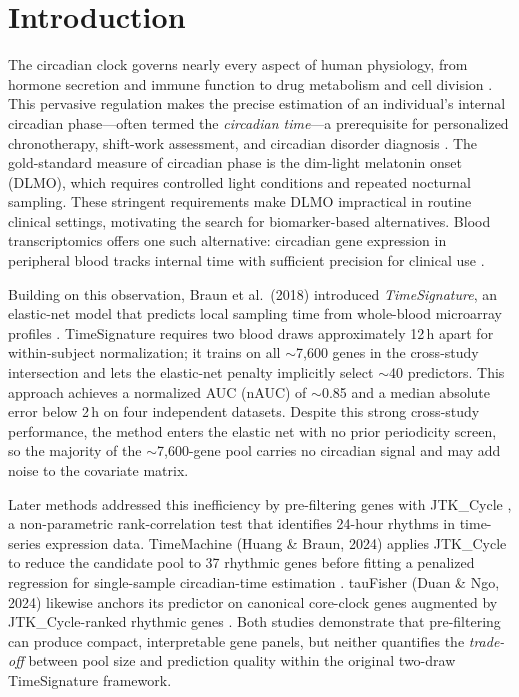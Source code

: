 \documentclass[10pt,a4paper]{article}
\begin{document}
\section{Introduction}

The circadian clock governs nearly every aspect of human physiology,
from hormone secretion and immune function to drug metabolism and cell
division \citep{Reppert2002}.
This pervasive regulation makes the precise estimation of an
individual's internal circadian phase---often termed the
\emph{circadian time}---a prerequisite for personalized chronotherapy,
shift-work assessment, and circadian disorder diagnosis
\citep{Archer2014}.
The gold-standard measure of circadian phase is the dim-light
melatonin onset (DLMO), which requires controlled light conditions
and repeated nocturnal sampling.
These stringent requirements make DLMO impractical in routine clinical
settings, motivating the search for biomarker-based alternatives.
Blood transcriptomics offers one such alternative: circadian gene
expression in peripheral blood tracks internal time with sufficient
precision for clinical use \citep{Moller2013}.

Building on this observation, Braun et al.\ (2018) introduced
\emph{TimeSignature}, an elastic-net model that predicts local
sampling time from whole-blood microarray profiles \citep{Braun2018}.
TimeSignature requires two blood draws approximately 12\,h apart for
within-subject normalization;
it trains on all ${\sim}$7,600 genes in
the cross-study intersection and lets the elastic-net penalty
implicitly select ${\sim}$40 predictors.
This approach achieves a normalized AUC (nAUC) of ${\sim}$0.85 and a
median absolute error below 2\,h on four independent datasets.
Despite this strong cross-study performance, the method enters the
elastic net with no prior periodicity screen, so the majority of the
${\sim}$7,600-gene pool carries no circadian signal and may add noise
to the covariate matrix.

Later methods addressed this inefficiency by pre-filtering genes with
JTK\_Cycle \citep{Hughes2010}, a non-parametric rank-correlation test
that identifies 24-hour rhythms in time-series expression data.
TimeMachine (Huang \& Braun, 2024) applies JTK\_Cycle to reduce
the candidate pool to 37 rhythmic genes before fitting a penalized
regression for single-sample circadian-time estimation
\citep{Huang2024}.
tauFisher (Duan \& Ngo, 2024) likewise anchors its predictor on
canonical core-clock genes augmented by JTK\_Cycle-ranked rhythmic
genes \citep{Duan2024}.
Both studies demonstrate that pre-filtering can produce compact,
interpretable gene panels, but neither quantifies the \emph{trade-off}
between pool size and prediction quality within the original
two-draw TimeSignature framework.
\end{document}

